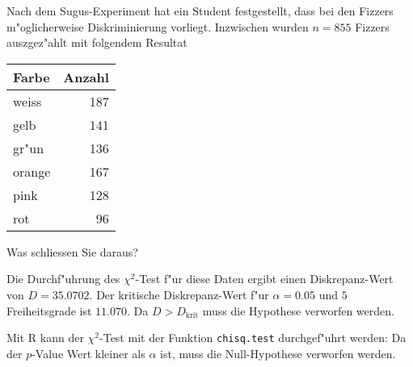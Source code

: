 Nach dem Sugus-Experiment hat ein Student festgestellt, dass bei den
Fizzers m"oglicherweise Diskriminierung vorliegt. Inzwischen wurden
$n=855$ Fizzers auszgez"ahlt mit folgendem Resultat
\begin{center}
\begin{tabular}{|l|r|}
\hline
Farbe&Anzahl\\
\hline
weiss&187\\
gelb&141\\
gr"un&136\\
orange&167\\
pink&128\\
rot&96\\
\hline
\end{tabular}
\end{center}
Was schliessen Sie daraus?

\begin{loesung}
Die Durchf"uhrung des $\chi^2$-Test f"ur diese Daten ergibt
einen Diskrepanz-Wert von $D=35.0702$. Der kritische Diskrepanz-Wert
f"ur $\alpha = 0.05$ und $5$ Freiheitsgrade ist $11.070$. Da
$D>D_{\text{krit}}$ muss die Hypothese verworfen werden.

Mit R kann der $\chi^2$-Test mit der Funktion {\tt chisq.test} durchgef"uhrt
werden:
Da der $p$-Value Wert kleiner als $\alpha$ ist, muss die
Null-Hypothese verworfen werden.
\end{loesung}
